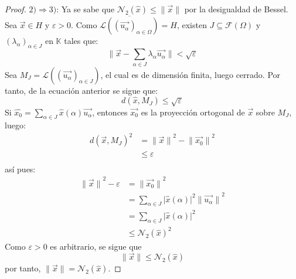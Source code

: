 \documentclass[12pt]{report}
\newcounter{it}
\theoremstyle{largebreak}
\newcommand\abs[1]{\ensuremath{\big|#1\big|}}
\newcommand\norm[1]{\ensuremath{\|#1\|}}
\newcommand{\N}[2]{\ensuremath{\mathcal{N}_{#1}\left(#2\right)}}
\begin{document}
\begin{proof}
        $2)\Rightarrow 3)$: Ya se sabe que $\N{2}{\hat{x}}\leq\norm{\vec{x}}$ por la desigualdad de Bessel.
        Sea $\vec{x}\in H$ y $\varepsilon>0$. Como $\overline{\mathcal{L}\left(\left(\vec{u_\alpha} \right)_{\alpha\in\Omega}\right)}= H$, existen $J\subseteq \mathcal{F}(\Omega)$ y $\left(\lambda_\alpha \right)_{\alpha\in J }$ en $\mathbb{K}$ tales que:
        \begin{equation}
            \norm{\vec{x}-\sum_{\alpha\in J }\lambda_\alpha\vec{u_\alpha}}<\sqrt{\varepsilon}
        \end{equation}
        Sea $M_J=\mathcal{L}\left(\left(\vec{u_\alpha} \right)_{ \alpha\in J} \right)$, el cual es de dimensión finita, luego cerrado. Por tanto, de la ecuación anterior se sigue que:
        \begin{equation*}
            d(\hat{x},M_J)\leq\sqrt{\varepsilon}
        \end{equation*}
        Si $\hat{x_0}=\sum_{\alpha\in J}\hat{x}(\alpha)\vec{u_\alpha}$, entonces $\vec{x_0}$ es la proyección ortogonal de $\vec{x}$ sobre $M_J$, luego:
        \begin{equation*}
            \begin{split}
                d(\vec{x},M_J)^2&=\norm{\vec{x}}^2-\norm{\vec{x_0}}^2\\
                &\leq\varepsilon\\
            \end{split}
        \end{equation*}
        así pues:
        \begin{equation*}
            \begin{split}
                \norm{\vec{x}}^2-\varepsilon&=\norm{\vec{x_0}}^2 \\
                &=\sum_{\alpha\in J}\abs{\hat{x}(\alpha)}^2\norm{\vec{u_\alpha}}^2\\
                &=\sum_{\alpha\in J}\abs{\hat{x}(\alpha)}^2\\
                &\leq\N{2}{\hat{x}}^2
            \end{split}
        \end{equation*}
        Como $\varepsilon>0$ es arbitrario, se sigue que
        \begin{equation*}
            \norm{\vec{x}}\leq\N{2}{\hat{x}}
        \end{equation*}
        por tanto, $\norm{\vec{x}}=\N{2}{\hat{x}}$.


\end{proof}
\end{document}
